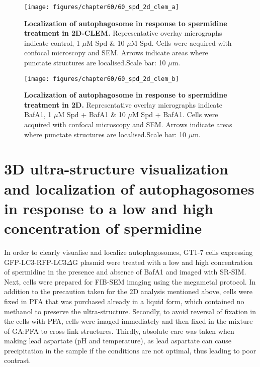 \begin{landscape}
\begin{figure}[!htbp]
\center
  \texttt{[image: figures/chapter60/60\_spd\_2d\_clem\_a]}
  \caption[Localization of autophagosome in response to spermidine treatment in 2D-CLEM]{\textbf{Localization of autophagosome in response to spermidine treatment in 2D-CLEM.} Representative overlay micrographs indicate control, 1 $\mu$M Spd \& 10 $\mu$M Spd. Cells were acquired with confocal microscopy and SEM. Arrows indicate areas where punctate structures are localised.Scale bar: 10 $\mu$m.}
  \label{fig:60_spd_2d_clem_a}
\end{figure} 
\end{landscape}

\begin{landscape}
\begin{figure}[!htbp]
\centering
  \texttt{[image: figures/chapter60/60\_spd\_2d\_clem\_b]}
  \caption[Localization of autophagosome in response to spermidine treatment in 2D]{\textbf{Localization of autophagosome in response to spermidine treatment in 2D.} Representative overlay micrographs indicate BafA1, 1 $\mu$M Spd + BafA1 \& 10 $\mu$M Spd + BafA1. Cells were acquired with confocal microscopy and SEM. Arrows indicate areas where punctate structures are localised.Scale bar: 10 $\mu$m.}
  \label{fig:60_spd_2d_clem_b}
\end{figure} 
\end{landscape}


\section{3D ultra-structure visualization and localization of autophagosomes  in response to a low and high concentration of spermidine}
In order to clearly visualise and localize autophagosomes, GT1-7 cells expressing GFP-LC3-RFP-LC3$\Delta$G plasmid were treated with a low and high concentration of spermidine in the presence and absence of BafA1 and imaged with SR-SIM. Next, cells were prepared for FIB-SEM imaging using the megametal protocol. In addition to the precaution taken for the 2D analysis mentioned above, cells were fixed in PFA that was purchased already in a liquid form, which contained no methanol to preserve the ultra-structure. Secondly, to avoid reversal of fixation in the cells with PFA, cells were imaged immediately and then fixed in the mixture of GA:PFA to cross link structures. Thirdly, absolute care was taken when making lead aspartate (pH and temperature), as lead aspartate can cause precipitation in the sample if the conditions are not optimal, thus leading to poor contrast.

